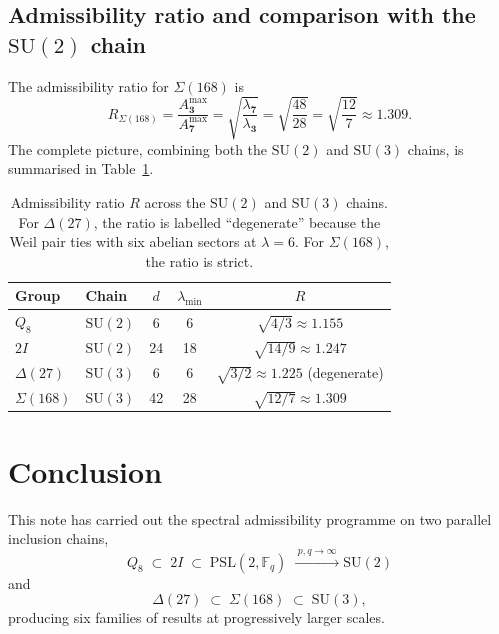 \documentclass[11pt,a4paper]{article}
\begin{document}
  \subsection{Admissibility ratio and comparison with the $\mathrm{SU}(2)$ chain}
    \label{sec:sigma168-ratio}

    The admissibility ratio for $\Sigma(168)$ is
    \begin{equation}
      R_{\Sigma(168)}
      = \frac{A^{\max}_{\mathbf{3}}}{A^{\max}_{\mathbf{7}}}
      = \sqrt{\frac{\lambda_{\mathbf{7}}}{\lambda_{\mathbf{3}}}}
      = \sqrt{\frac{48}{28}}
      = \sqrt{\frac{12}{7}}
      \approx 1.309.
      \label{eq:R-sigma168}
    \end{equation}
    The complete picture, combining both the $\mathrm{SU}(2)$ and $\mathrm{SU}(3)$ chains,
    is summarised in Table~\ref{tab:full-chain}.

    \begin{table}[h]
      \centering
      \renewcommand{\arraystretch}{1.3}
      \begin{tabular}{llccc}
        \hline
        Group & Chain & $d$ & $\lambda_{\min}$ & $R$ \\
        \hline
        $Q_8$ & $\mathrm{SU}(2)$ & 6  & 6  & $\sqrt{4/3} \approx 1.155$ \\
        $2I$  & $\mathrm{SU}(2)$ & 24 & 18 & $\sqrt{14/9} \approx 1.247$ \\
        $\Delta(27)$ & $\mathrm{SU}(3)$ & 6 & 6 & $\sqrt{3/2} \approx 1.225$
        (degenerate) \\
        $\Sigma(168)$ & $\mathrm{SU}(3)$ & 42 & 28 & $\sqrt{12/7} \approx 1.309$ \\
        \hline
      \end{tabular}
      \caption{Admissibility ratio $R$ across the $\mathrm{SU}(2)$ and $\mathrm{SU}(3)$
      chains.
      For $\Delta(27)$, the ratio is labelled ``degenerate'' because the Weil pair ties
      with six abelian sectors at $\lambda = 6$.
      For $\Sigma(168)$, the ratio is strict.}
      \label{tab:full-chain}
    \end{table}

\section{Conclusion}
  \label{sec:conclusion}

  This note has carried out the spectral admissibility programme on two parallel
  inclusion chains,
  \begin{equation}
    Q_8 \;\subset\; 2I \;\subset\; \mathrm{PSL}(2,\mathbb{F}_q)
    \;\xrightarrow{\;p,q\to\infty\;}
    \mathrm{SU}(2)
    \label{eq:chain-conclusion}
  \end{equation}
  and
  \begin{equation}
    \Delta(27) \;\subset\; \Sigma(168) \;\subset\; \mathrm{SU}(3),
    \label{eq:chain-su3-conclusion}
  \end{equation}
  producing six families of results at progressively larger scales.
\end{document}
